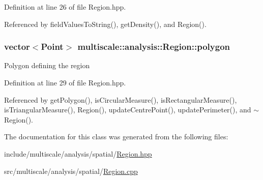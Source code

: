 Definition at line 26 of file Region.\-hpp.



Referenced by field\-Values\-To\-String(), get\-Density(), and Region().

\hypertarget{classmultiscale_1_1analysis_1_1Region_a40d1b47f30bb09c6a47521a968163b6d}{
\subsubsection[{polygon}]{\setlength{\rightskip}{0pt plus 5cm}vector$<$Point$>$ multiscale\-::analysis\-::\-Region\-::polygon\hspace{0.3cm}{\ttfamily [private]}}}\label{classmultiscale_1_1analysis_1_1Region_a40d1b47f30bb09c6a47521a968163b6d}
Polygon defining the region 

Definition at line 29 of file Region.\-hpp.



Referenced by get\-Polygon(), is\-Circular\-Measure(), is\-Rectangular\-Measure(), is\-Triangular\-Measure(), Region(), update\-Centre\-Point(), update\-Perimeter(), and $\sim$\-Region().



The documentation for this class was generated from the following files\-:\begin{DoxyCompactItemize}
\item 
include/multiscale/analysis/spatial/\hyperlink{Region_8hpp}{Region.\-hpp}\item 
src/multiscale/analysis/spatial/\hyperlink{Region_8cpp}{Region.\-cpp}\end{DoxyCompactItemize}
